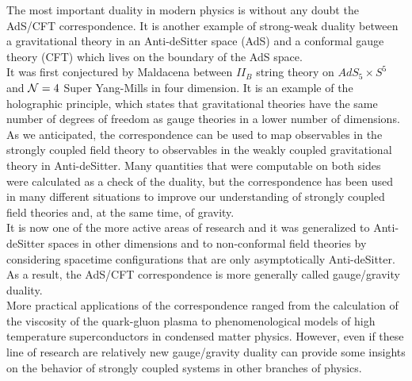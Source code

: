 The most important duality in modern physics is without any doubt the AdS/CFT correspondence. 
It is another example of strong-weak duality between a gravitational theory in an Anti-deSitter space (AdS) and a conformal gauge theory (CFT) which lives on the boundary of the AdS space. \\
It was first conjectured by Maldacena between $II_B$ string theory on $AdS_5 \times S^5$ and $\mathcal{N}=4$ Super Yang-Mills in four dimension. 
It is an example of the holographic principle, which states that gravitational theories have the same number of degrees of freedom as gauge theories in a lower number of dimensions.\\
As we anticipated, the correspondence can be used to map observables in the strongly coupled field theory to observables in the weakly coupled gravitational theory in Anti-deSitter.
Many quantities that were computable on both sides were calculated as a check of the duality, but the correspondence has been used in many different situations to improve our understanding of strongly coupled field theories and, at the same time, of gravity. \\
It is now one of the more active areas of research and it was generalized to  Anti-deSitter spaces in other dimensions and to non-conformal field theories by considering spacetime configurations that are only asymptotically Anti-deSitter.
As a result, the AdS/CFT correspondence is more generally called gauge/gravity duality.  \\
More practical applications of the correspondence ranged from the calculation of the viscosity of the quark-gluon plasma to phenomenological models of high temperature superconductors in condensed matter physics.
However, even if these line of research are relatively new gauge/gravity duality can provide some insights on the behavior of strongly coupled systems in other branches of physics.   
\\ 

